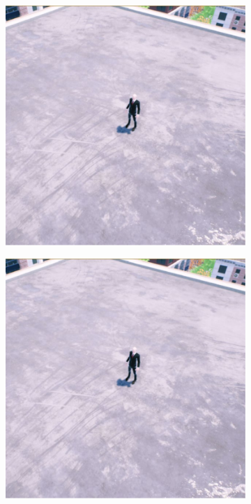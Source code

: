 \begin{figure}[ht]
 \centering
  \begin{subfigure}{.35\linewidth}
    \centering\includegraphics[page=1, width=.99\linewidth]{chapter_6_landingsim/figs/DecisionPointImages.pdf}
    \caption{\label{fig:ch6_dp_a}}
  \end{subfigure}
  \begin{subfigure}{.35\linewidth}
    \centering\includegraphics[page=2, width=.99\linewidth]{chapter_6_landingsim/figs/DecisionPointImages.pdf}

\end{subfigure}
\end{figure}

